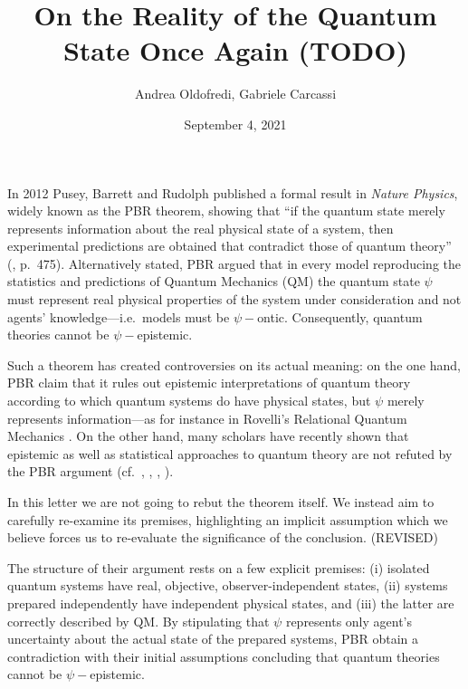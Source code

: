 \documentclass[aps,twocolumn,showpacs,preprintnumbers]{revtex4}
\begin{document}
	
	
	\title{\textbf{On the Reality of the Quantum State Once Again (TODO)}}
	
	\author{Andrea Oldofredi, Gabriele Carcassi}
	
	\date{September 4, 2021}
	
	\maketitle
	
	
	In 2012 Pusey, Barrett and Rudolph published a formal result in \emph{Nature Physics}, widely known as the PBR theorem, showing that ``if the quantum state merely represents information about the real physical state of a system, then experimental predictions are obtained that contradict those of quantum theory'' (\cite{PBR:2012}, p.\ 475). Alternatively stated, PBR argued that in every model reproducing the statistics and predictions of Quantum Mechanics (QM) the quantum state $\psi$ must represent real physical properties of the system under consideration and not agents' knowledge---i.e.\ models must be $\psi-$ontic. Consequently, quantum theories cannot be $\psi-$epistemic. 
	
	Such a theorem has created controversies on its actual meaning: on the one hand, PBR claim that it rules out epistemic interpretations of quantum theory according to which quantum systems do have physical states, but $\psi$ merely represents information---as for instance in Rovelli's Relational Quantum Mechanics \cite{Rovelli:1996}. On the other hand, many scholars have recently shown that epistemic as well as statistical approaches to quantum theory are not refuted by the PBR argument (cf.\ \cite{Ben:2017}, \cite{Rizzi:2018}, \cite{Oldofredi:2021}, \cite{DeBrota:2019}).
	
	In this letter we are not going to rebut the theorem itself. We instead aim to carefully re-examine its premises, highlighting an implicit assumption which we believe forces us to re-evaluate the significance of the conclusion. (REVISED)
	
	The structure of their argument rests on a few explicit premises: (i) isolated quantum systems have real, objective, observer-independent states, (ii) systems prepared independently have independent physical states, and (iii) the latter are correctly described by QM. By stipulating that $\psi$ represents only agent's uncertainty about the actual state of the prepared systems, PBR obtain a contradiction with their initial assumptions concluding that quantum theories cannot be $\psi-$epistemic. 
	
\end{document}
